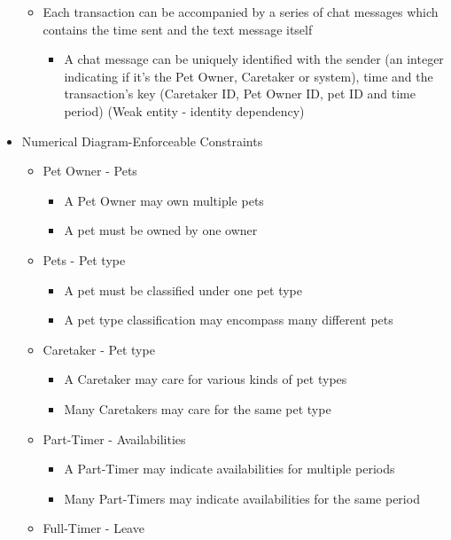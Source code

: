 \documentclass[10pt]{article}
\begin{document}
\begin{itemize}
\begin{itemize}
\begin{itemize}
        \end{itemize}
        \item Each transaction can be accompanied by a series of chat messages which contains the time sent and the text message itself
        \begin{itemize}
            \item A chat message can be uniquely identified with the sender (an integer indicating if it's the Pet Owner, Caretaker or system), time and the transaction's key (Caretaker ID, Pet Owner ID, pet ID and time period) (Weak entity - identity dependency)
        \end{itemize}
    \end{itemize}
    
    \item Numerical Diagram-Enforceable Constraints
    \begin{itemize}
        \item Pet Owner - Pets
        \begin{itemize}
            \item A Pet Owner may own multiple pets
            \item A pet must be owned by one owner
        \end{itemize}
        \item Pets - Pet type
        \begin{itemize}
            \item A pet must be classified under one pet type
            \item A pet type classification may encompass many different pets
        \end{itemize}
        \item Caretaker - Pet type
        \begin{itemize}
            \item A Caretaker may care for various kinds of pet types
            \item Many Caretakers may care for the same pet type
        \end{itemize}
        \item Part-Timer - Availabilities
        \begin{itemize}
            \item A Part-Timer may indicate availabilities for multiple periods
            \item Many Part-Timers may indicate availabilities for the same period
	    \end{itemize}
        \item Full-Timer - Leave

\end{itemize}
\end{itemize}
\end{document}
